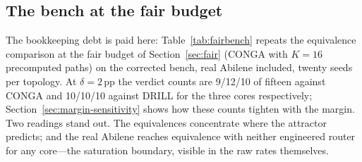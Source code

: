 \subsection{The bench at the fair budget}
\label{sec:fairbench}
The bookkeeping debt is paid here: Table~\ref{tab:fairbench} repeats the
equivalence comparison at the fair budget of Section~\ref{sec:fair}
(CONGA with $K{=}16$ precomputed paths) on the corrected bench, real Abilene
included, twenty seeds per topology. At $\delta=2$\,pp the verdict counts are
9/12/10 of fifteen against CONGA and 10/10/10 against DRILL for the three cores
respectively; Section~\ref{sec:margin-sensitivity} shows how these counts
tighten with the margin. Two readings stand out. The equivalences concentrate
where the attractor predicts; and the real Abilene reaches equivalence with
neither engineered router for any core---the saturation boundary, visible in
the raw rates themselves.
